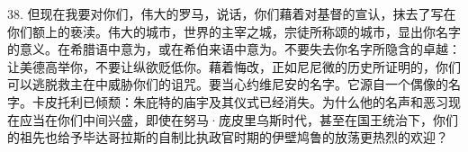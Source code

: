 38. 但现在我要对你们，伟大的罗马，说话，你们藉着对基督的宣认，抹去了写在你们额上的亵渎。伟大的城市，世界的主宰之城，宗徒所称颂的城市，显出你名字的意义。在希腊语中意为，或在希伯来语中意为。不要失去你名字所隐含的卓越：让美德高举你，不要让纵欲贬低你。藉着悔改，正如尼尼微的历史所证明的，你们可以逃脱救主在中威胁你们的诅咒。要当心约维尼安的名字。它源自一个偶像的名字。卡皮托利已倾颓：朱庇特的庙宇及其仪式已经消失。为什么他的名声和恶习现在应当在你们中间兴盛，即使在努马·庞皮里乌斯时代，甚至在国王统治下，你们的祖先也给予毕达哥拉斯的自制比执政官时期的伊壁鸠鲁的放荡更热烈的欢迎？\par

